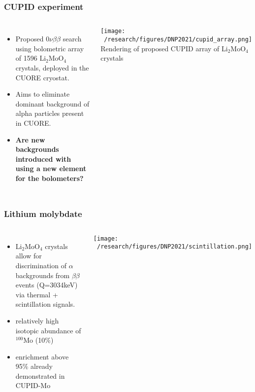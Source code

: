 \documentclass{beamer}
\begin{document}
	\begin{frame}
		\frametitle{CUPID experiment}
		\begin{columns}[c] %
			
			\begin{itemize}
				\setlength\itemsep{2em}
				\item Proposed $0\nu\beta\beta$ search using bolometric array of 1596 Li$_2$MoO$_4$ crystals, deployed in the CUORE cryostat.
				\item Aims to eliminate dominant background of alpha particles present in CUORE.
				\item \textbf{Are new backgrounds introduced with using a new element for the bolometers?}
			\end{itemize}
			
			\texttt{[image: ~/research/figures/DNP2021/cupid\_array.png]}
			{\footnotesize Rendering of proposed CUPID array of Li$_2$MoO$_4$ crystals}
			
		\end{columns}
	\end{frame}
	

	\begin{frame}
		\frametitle{Lithium molybdate}
		\begin{columns}[c] %
			
			\begin{itemize}
				\setlength\itemsep{2em}
				\item Li$_2$MoO$_4$ crystals allow for discrimination of $\alpha$ backgrounds from $\beta\beta$ events (Q=3034keV) via thermal + scintillation signals.
				\item relatively high isotopic abundance of $^{100}$Mo (10\%)
				\item enrichment above 95\% already demonstrated in CUPID-Mo \cite{}
			\end{itemize}
			
			\texttt{[image: ~/research/figures/DNP2021/scintillation.png]}
		\end{columns}
	\end{frame}
\end{document}
